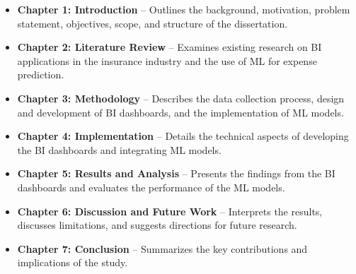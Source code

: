 \begin{itemize}
    \item \textbf{Chapter 1: Introduction} – Outlines the background, motivation, problem statement, objectives, scope, and structure of the dissertation.
    \item \textbf{Chapter 2: Literature Review} – Examines existing research on BI applications in the insurance industry and the use of ML for expense prediction.
    \item \textbf{Chapter 3: Methodology} – Describes the data collection process, design and development of BI dashboards, and the implementation of ML models.
    \item \textbf{Chapter 4: Implementation} – Details the technical aspects of developing the BI dashboards and integrating ML models.
    \item \textbf{Chapter 5: Results and Analysis} – Presents the findings from the BI dashboards and evaluates the performance of the ML models.
    \item \textbf{Chapter 6: Discussion and Future Work} – Interprets the results, discusses limitations, and suggests directions for future research.
    \item \textbf{Chapter 7: Conclusion} – Summarizes the key contributions and implications of the study.
\end{itemize}